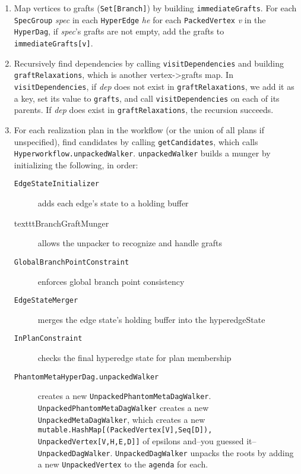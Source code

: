 \documentclass{report}
\begin{document}
\begin{enumerate}

\item Map vertices to grafts (\texttt{Set[Branch]}) by building \texttt{immediateGrafts}. For each \texttt{SpecGroup} \textit{spec}
      in each \texttt{HyperEdge} \textit{he} for each \texttt{PackedVertex} \textit{v} in the \texttt{HyperDag},  if \textit{spec}'s
      grafts are not empty, add the grafts to \texttt{immediateGrafts[v]}.

\item Recursively find dependencies by calling \texttt{visitDependencies} and building \texttt{graftRelaxations}, which is another
      vertex->grafts map. In \texttt{visitDependencies}, if \textit{dep} does not exist in \texttt{graftRelaxations}, we add it as a key, 
      set its value to \texttt{grafts}, and call \texttt{visitDependencies} on each of its parents. If \textit{dep} does exist in
      \texttt{graftRelaxations}, the recursion succeeds.

\item For each realization plan in the workflow (or the union of all plans if unspecified), find candidates by calling \texttt{getCandidates},
      which calls \texttt{Hyperworkflow.unpackedWalker}. \texttt{unpackedWalker} builds a munger by initializing the following, in order:

	\begin{description}

	\item[\texttt{EdgeStateInitializer}] adds each edge's state to a holding buffer

	\item[texttt{BranchGraftMunger}] allows the unpacker to recognize and handle grafts

	\item[\texttt{GlobalBranchPointConstraint}] enforces global branch point consistency

	\item[\texttt{EdgeStateMerger}] merges the edge state's holding buffer into the hyperedgeState

	\item[\texttt{InPlanConstraint}] checks the final hyperedge state for plan membership

	\item[\texttt{PhantomMetaHyperDag.unpackedWalker}] creates a new \texttt{UnpackedPhantomMetaDagWalker}. \texttt{UnpackedPhantomMetaDagWalker}
	      creates a new \texttt{UnpackedMetaDagWalker}, which creates a new \texttt{mutable.HashMap[(PackedVertex[V],Seq[D]), UnpackedVertex[V,H,E,D]]}
	      of epsilons and--you guessed it--\texttt{UnpackedDagWalker}. \texttt{UnpackedDagWalker} unpacks the roots by adding a new \texttt{UnpackedVertex}
	      to the \texttt{agenda} for each.


\end{description}
\end{enumerate}
\end{document}

